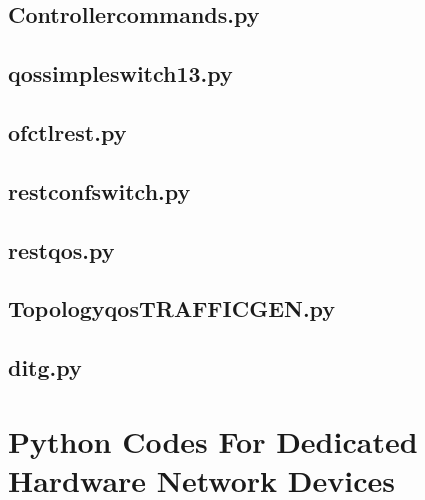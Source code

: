 \documentclass[12pt, a4paper, twoside, openright]{ociamthesis}  %
\begin{document}
\section{Controller\textunderscore commands.py}\label{Controller_commands}

\section{qos\textunderscore simple\textunderscore switch\textunderscore 13.py}\label{qos_simple_switch_13}

\section{ofctl\textunderscore rest.py}\label{ofctl_rest}

\section{rest\textunderscore conf\textunderscore switch.py}\label{rest_conf_switch}

\section{rest\textunderscore qos.py}\label{rest_qos}

\section{Topology\textunderscore qos\textunderscore TRAFFIC\textunderscore GEN.py}\label{Topology}

\section{ditg.py}\label{ditg}


\lstset{firstnumber=2}
\chapter{Python Codes For Dedicated Hardware Network Devices}\label{Py_codes_RNT}
\end{document}
